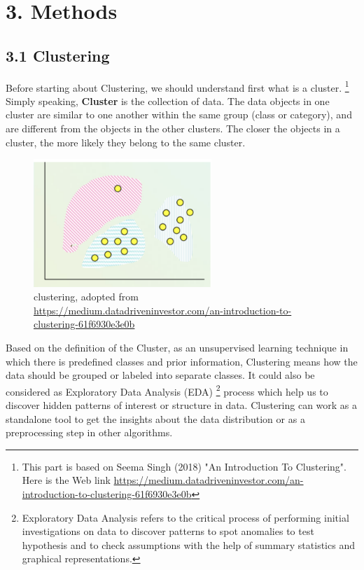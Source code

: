 \documentclass[nobib]{tufte-handout}
\begin{document}



\clearpage
\bigskip
\section{\textbf{3. Methods}}
\subsection{\textbf{3.1 Clustering}}


Before starting about Clustering, we should understand first what is a cluster. \footnote{This part is based on Seema Singh
 (2018) "An Introduction To Clustering". Here is the Web link \url{https://medium.datadriveninvestor.com/an-introduction-to-clustering-61f6930e3e0b}} Simply speaking,  \textbf{Cluster} is the collection of data. The data objects in one cluster are similar to one another within the same group (class or category),  and are different from the objects in the other clusters. 
The closer the objects in a cluster, the more likely they belong to the same cluster.

\begin{figure}
 \includegraphics[width=0.6\textwidth]{clustering.png}
  \caption{clustering, adopted from \url{https://medium.datadriveninvestor.com/an-introduction-to-clustering-61f6930e3e0b}}
\end{figure}

Based on the definition of the Cluster,  as an unsupervised learning technique in which there is predefined classes and prior information, Clustering means how the data should be grouped or labeled into separate classes. 
It could also be considered as Exploratory Data Analysis (EDA) \footnote{Exploratory Data Analysis refers to the critical process of performing initial investigations on data to discover patterns to spot anomalies to test hypothesis and to check assumptions with the help of summary statistics and graphical representations.} process which help us to discover hidden patterns of interest or structure in data. Clustering can work as a standalone tool to get the insights about the data distribution or as a preprocessing step in other algorithms.
\end{document}
